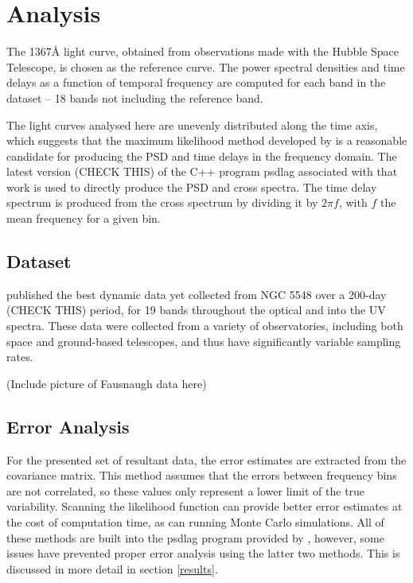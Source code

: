 \documentclass[11pt,letterpaper]{article}
\begin{document}
\section{Analysis}
The 1367\AA$ $ light curve, obtained from observations made with the Hubble
Space Telescope, is chosen as the reference curve. The power spectral
densities and time delays as a function of temporal frequency are computed for
each band in the dataset -- 18 bands not including the reference band.

The light curves analysed here are unevenly distributed along the time axis,
which suggests that the maximum likelihood method developed by
\cite{2013ApJ...777...24Z} is a reasonable candidate for producing the PSD and
time delays in the frequency domain. The latest version (CHECK THIS) of the
C++ program psdlag associated with that work is used to directly produce the
PSD and cross spectra. The time delay spectrum is produced from the cross
spectrum by dividing it by $2 \pi f$, with $f$ the mean frequency for a given
bin.

	\subsection{Dataset}
	\cite{2016ApJ...821...56F} published the best dynamic data yet collected
	from NGC 5548 over a 200-day (CHECK THIS) period, for 19 bands throughout
	the optical and into the UV spectra. These data were collected from a
	variety of observatories, including both space and ground-based
	telescopes, and thus have significantly variable sampling rates.

	(Include picture of Fausnaugh data here)

	\subsection{Error Analysis}
	For the presented set of resultant data, the error estimates are extracted
	from the covariance matrix. This method assumes that the errors between
	frequency bins are not correlated, so these values only represent a lower
	limit of the true variability. Scanning the likelihood function can
	provide better error estimates at the cost of computation time, as can
	running Monte Carlo simulations. All of these methods are built into the
	psdlag program provided by \cite{2013ApJ...777...24Z}, however, some
	issues have prevented proper error analysis using the latter two methods.
	This is discussed in more detail in section \ref{results}.
\end{document}

